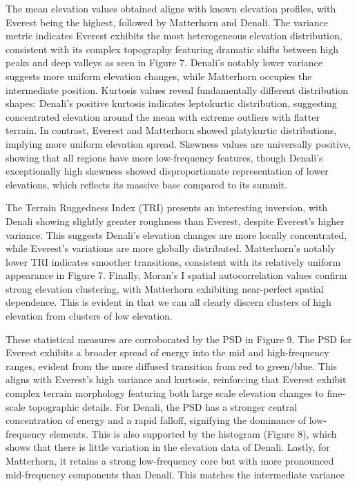 The mean elevation values obtained aligns with known elevation profiles, with Everest being the highest, followed by Matterhorn and Denali. The variance metric indicates Everest exhibits 
the most heterogeneous elevation distribution, consistent with its complex topography featuring dramatic shifts between high peaks and deep valleys as seen in Figure 7. Denali's notably 
lower variance suggests more uniform elevation changes, while Matterhorn occupies the intermediate position. Kurtosis values reveal fundamentally different distribution shapes: Denali's 
positive kurtosis indicates leptokurtic distribution, suggesting concentrated elevation around the mean with extreme outliers with flatter terrain. In contrast, Everest and Matterhorn 
showed platykurtic distributions, implying more uniform elevation spread. Skewness values are universally positive, showing that all regions have more low-frequency features, though 
Denali's exceptionally high skewness showed disproportionate representation of lower elevations, which reflects its massive base compared to its summit. 

The Terrain Ruggedness Index (TRI) presents an interesting inversion, with Denali showing slightly greater roughness than Everest, despite Everest's higher variance. This suggests 
Denali's elevation changes are more locally concentrated, while Everest's variations are more globally distributed. Matterhorn's notably lower TRI indicates smoother transitions, 
consistent with its relatively uniform appearance in Figure 7. Finally, Moran's I spatial autocorrelation values confirm strong elevation clustering, with Matterhorn exhibiting near-perfect 
spatial dependence. This is evident in that we can all clearly discern clusters of high elevation from clusters of low elevation. 

These statistical measures are corroborated by the PSD in Figure 9. The PSD for Everest exhibits a broader spread of energy into the mid and high-frequency ranges, evident from the more 
diffused transition from red to green/blue. This aligns with Everest's high variance and kurtosis, reinforcing that Everest exhibit complex terrain morphology featuring both large scale 
elevation changes to fine-scale topographic details. For Denali, the PSD has a stronger central concentration of energy and a rapid falloff, signifying the dominance of low-frequency elements. 
This is also supported by the histogram (Figure 8), which shows that there is little variation in the elevation data of Denali. Lastly, for Matterhorn, it retains a strong low-frequency core 
but with more pronounced mid-frequency components than Denali. This matches the intermediate variance and skewness in elevation distribution.

